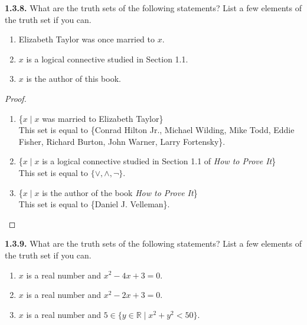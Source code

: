 \documentclass[12pt]{amsart}
\newenvironment{statement}[1]{\smallskip\noindent\color[rgb]{.6627, .3529, .6314} {\bf #1.}}{}
\theoremstyle{definition}
\theoremstyle{remark}
\newcommand{\BR}{\mathbb R}
\begin{document}
\begin{statement}{1.3.8}
What are the truth sets of the following statements?
List a few elements of the truth set if you can.
\begin{enumerate}
	\item Elizabeth Taylor was once married to $x$.
	\item $x$ is a logical connective studied in Section 1.1.
	\item $x$ is the author of this book.
\end{enumerate}
\end{statement}

\begin{proof}
\hfill
\begin{enumerate}
	\item \{$x \mid x$ was married to Elizabeth Taylor\} \\
	This set is equal to \{Conrad Hilton Jr., Michael Wilding, Mike Todd, Eddie Fisher, Richard Burton,
	John Warner, Larry Fortensky\}.
	
	\item \{$x \mid x$ is a logical connective studied in Section 1.1 of \emph{How to Prove It}\} \\
	This set is equal to $\{ \vee, \wedge, \neg \}$.
	
	\item \{$x \mid x$ is the author of the book \emph{How to Prove It}\} \\
	This set is equal to \{Daniel J. Velleman\}.
\end{enumerate}
\end{proof}


\begin{statement}{1.3.9}
What are the truth sets of the following statements?
List a few elements of the truth set if you can.
\begin{enumerate}
	\item $x$ is a real number and $x^2 - 4x + 3 = 0$.
	\item $x$ is a real number and $x^2 - 2x + 3 = 0$.
	\item $x$ is a real number and $5 \in \{ y \in \BR \mid x^2 + y^2 < 50 \}$.
\end{enumerate}
\end{statement}
\end{document}
